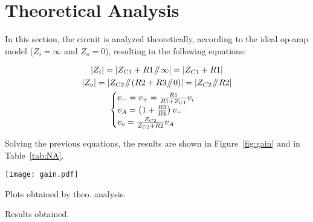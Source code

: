 \section{Theoretical Analysis}
\label{sec:analysis}

In this section, the circuit is analyzed theoretically, according to the ideal
op-amp model ($Z_i =\infty$ and $Z_o=0$), resulting in the following equations:

\begin{gather}\label{step}
  |Z_i| = |Z_{C1} + R1 \parallelsum \infty| = |Z_{C1} + R1|\\
  |Z_o| = |Z_{C2} \parallelsum (R2 + R3 \parallelsum 0)| = |Z_{C2} \parallelsum R2|\\
  \begin{cases}
    v_- = v_+ = \frac{R1}{R1+Z_{C1}} v_i\\
    v_A = \left(1 + \frac{R3}{R4}\right) v_-\\
    v_o = \frac{Z_{C2}}{Z_{C2}+R2} v_A\\
  \end{cases}
\end{gather}

Solving the previous equations, the results are shown in Figure~\ref{fig:gain} and in Table~\ref{tab:NA}.\\

\begin{minipage}[b]{0.49\textwidth}
  \centering
  \texttt{[image: gain.pdf]}
  \captionsetup{type=figure}
  \caption{Plots obtained by theo. analysis.}
  \label{fig:gain}  
\end{minipage}
\hfill
\begin{minipage}[b]{0.49\textwidth}
  \centering
  
  \captionsetup{type=table}
  \caption{Results obtained.}
  \label{tab:NA}
\end{minipage}


